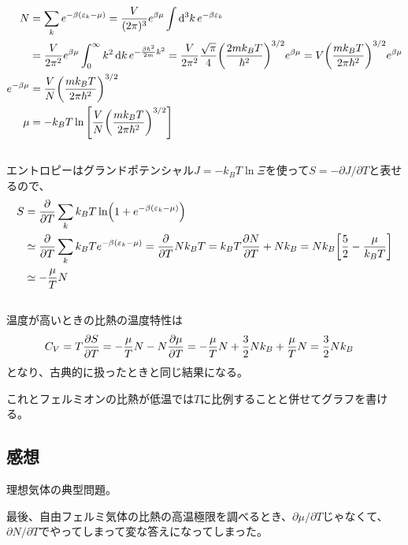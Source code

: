 \documentclass[../../sp_2019.tex]{subfiles}
\begin{document}
\subsection{}
\begin{equation}\begin{aligned}[b]
    N &= \sum_k e^{-\beta(\varepsilon_k-\mu)}
        = \frac{V}{(2\pi)^3}e^{\beta\mu}\int \dd[3]{k} e^{-\beta\varepsilon_k}\\
    &= \frac{V}{2\pi^2}e^{\beta\mu}\int_{0}^{\infty}k^2\dd{k}e^{-\frac{\beta \hbar^2}{2m}k^2}
        =\frac{V}{2\pi^2}\frac{\sqrt{\pi}}{4}\qty(\frac{2mk_BT}{\hbar^2})^{3/2}e^{\beta\mu}
        =V\qty(\frac{mk_BT}{2\pi\hbar^2})^{3/2}e^{\beta\mu}\\
    e^{-\beta\mu}&= \frac{V}{N}\qty(\frac{mk_BT}{2\pi\hbar^2})^{3/2}\\
    \mu &= -k_BT\ln\qty[\frac{V}{N}\qty(\frac{mk_BT}{2\pi\hbar^2})^{3/2}]
\end{aligned}\end{equation}

\subsection{}
エントロピーはグランドポテンシャル\(J=-k_BT\ln\Xi\)を使って\(S=-\partial J/\partial T\)と表せるので、
\begin{equation}\begin{aligned}[b]
    S &= \pdv{T}\sum_k k_BT\ln(1+e^{-\beta(\varepsilon_k-\mu)})\\
    & \simeq \pdv{T}\sum_k k_BTe^{-\beta(\varepsilon_k-\mu)}
        =\pdv{T}Nk_BT
        = k_BT\pdv{N}{T}+Nk_B
        = Nk_B\qty[\frac{5}{2}-\frac{\mu}{k_BT}]\\
    &\simeq -\frac{\mu}{T}N
\end{aligned}\end{equation}

\subsection{}
温度が高いときの比熱の温度特性は
\begin{equation}\begin{aligned}[b]
    C_V &= T\pdv{S}{T}
        = -\frac{\mu}{T}N -N\pdv{\mu}{T}
        = -\frac{\mu}{T}N +\frac{3}{2}Nk_B +\frac{\mu}{T}N
        =  \frac{3}{2}Nk_B
\end{aligned}\end{equation}
となり、古典的に扱ったときと同じ結果になる。

これとフェルミオンの比熱が低温では\(T\)に比例することと併せてグラフを書ける。

\subsection*{感想}
理想気体の典型問題。

最後、自由フェルミ気体の比熱の高温極限を調べるとき、\(\partial\mu/\partial T\)じゃなくて、
\(\partial N/\partial T\)でやってしまって変な答えになってしまった。
\end{document}
